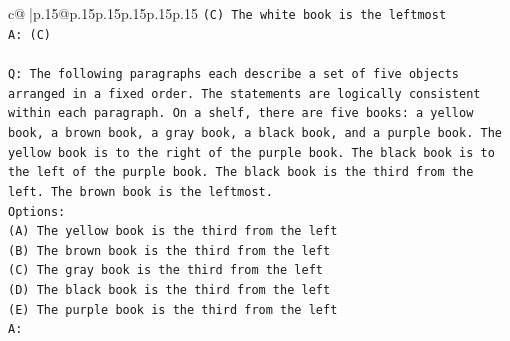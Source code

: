 \documentclass{article}
\begin{document}
{\begin{supertabular}{c@{$\;$}|p{.15\linewidth}@{}p{.15\linewidth}p{.15\linewidth}p{.15\linewidth}p{.15\linewidth}p{.15\linewidth}}
{{{\texttt{(C) The white book is the leftmost} \\
\texttt{A: (C)} \\
\\ 
\texttt{Q: The following paragraphs each describe a set of five objects arranged in a fixed order. The statements are logically consistent within each paragraph. On a shelf, there are five books: a yellow book, a brown book, a gray book, a black book, and a purple book. The yellow book is to the right of the purple book. The black book is to the left of the purple book. The black book is the third from the left. The brown book is the leftmost.} \\
\texttt{Options:} \\
\texttt{(A) The yellow book is the third from the left} \\
\texttt{(B) The brown book is the third from the left} \\
\texttt{(C) The gray book is the third from the left} \\
\texttt{(D) The black book is the third from the left} \\
\texttt{(E) The purple book is the third from the left} \\
\texttt{A:} \\
            }
        }
    }
     \\ \\


\end{supertabular}}
\end{document}
